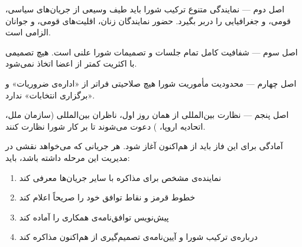 \begin{bandbox}{اصل دوم --- نمایندگی متنوع}
ترکیب شورا باید طیف وسیعی از جریان‌های سیاسی، قومی، و جغرافیایی را دربر بگیرد.
حضور نمایندگان زنان، اقلیت‌های قومی، و جوانان الزامی است.
\end{bandbox}

\begin{bandbox}{اصل سوم --- شفافیت کامل}
تمام جلسات و تصمیمات شورا علنی است. هیچ تصمیمی با اکثریت کمتر از
 اعضا اتخاذ نمی‌شود.
\end{bandbox}

\begin{bandbox}{اصل چهارم --- محدودیت مأموریت}
شورا هیچ صلاحیتی فراتر از «اداره‌ی ضروریات» و «برگزاری انتخابات» ندارد.
\end{bandbox}

\begin{bandbox}{اصل پنجم --- نظارت بین‌المللی}
از همان روز اول، ناظران بین‌المللی (سازمان ملل، اتحادیه اروپا، ) دعوت
می‌شوند تا بر کار شورا نظارت کنند.
\end{bandbox}

\begin{notebox}[title={\rl{فراخوان به جریان‌های اپوزیسیون}}]
آمادگی برای این فاز باید از هم‌اکنون آغاز شود. هر جریانی که می‌خواهد نقشی در
مدیریت این مرحله داشته باشد، باید:
\begin{enumerate}
  \item نماینده‌ی مشخص برای مذاکره با سایر جریان‌ها معرفی کند
  \item خطوط قرمز و نقاط توافق خود را صریحاً اعلام کند
  \item پیش‌نویس توافق‌نامه‌ی همکاری را آماده کند
  \item درباره‌ی ترکیب شورا و آیین‌نامه‌ی تصمیم‌گیری از هم‌اکنون مذاکره کند
\end{enumerate}
\end{notebox}


